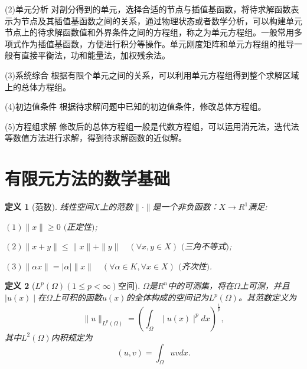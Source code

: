 \documentclass[twoside,UTF8]{nputhesis}
\begin{document}
(2)单元分析
对剖分得到的单元，选择合适的节点与插值基函数，将待求解函数表示为节点及其插值基函数之间的关系，通过物理状态或者数学分析，可以构建单元节点上的待求解函数值和外界条件之间的方程组，称之为单元方程组。一般常用多项式作为插值基函数，方便进行积分等操作。单元刚度矩阵和单元方程组的推导一般有直接平衡法，功和能量法，加权残余法\cite{L2003}。

(3)系统综合
根据有限个单元之间的关系，可以利用单元方程组得到整个求解区域上的总体方程组。

(4)初边值条件
根据待求解问题中已知的初边值条件，修改总体方程组。

(5)方程组求解
修改后的总体方程组一般是代数方程组，可以运用消元法，迭代法等数值方法进行求解，得到待求解函数的近似解。
\section{有限元方法的数学基础}
\newtheorem{Definition}{\hspace{2em}定义}[chapter]
\begin{Definition}
[范数\cite{fanhan2006}]{
	线性空间$X$上的范数$\| \cdot\|$是一个非负函数：$X\rightarrow R^1$满足:
	
	$(1) \|x\|\geq0$   \quad$($正定性$)$;
	
	$(2) \|x+y\|\leq\| x\|+\| y\| \quad (\forall x,y\in X)$  \quad$($三角不等式$)$;
	
	$(3) \| \alpha x\|=\mid \alpha\mid\| x\| \quad(\forall\alpha\in K,\forall x\in X)$  \quad$($齐次性$)$.
}
\end{Definition}
\begin{Definition}
	[$L^p(\Omega)(1\leq p<\infty)$空间]{
	$\Omega$是$R^n$中的可测集，将在$\Omega$上可测，并且$\mid u(x)\mid$在$\Omega$上可积的函数$u(x)$的全体构成的空间记为$L^p(\Omega)$。其范数定义为
	\begin{equation*}
	\| u\|_{L^p(\Omega)}=(\int_\Omega\mid u(x)\mid^pdx)^{\frac{1}{p}},
	\end{equation*}
	其中$L^2(\Omega)$内积规定为
	\begin{equation*}
	(u,v)=\int_\Omega uvdx.
	\end{equation*}}
\end{Definition}
\end{document}
